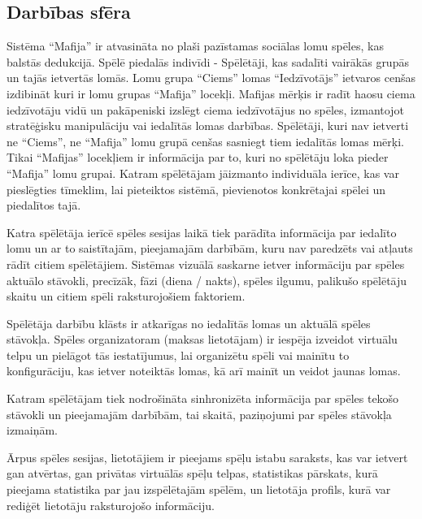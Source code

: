 \subsection*{Darbības sfēra}

Sistēma ``Mafija'' ir atvasināta no plaši pazīstamas sociālas lomu spēles, kas
balstās dedukcijā. Spēlē piedalās indivīdi - Spēlētāji, kas sadalīti vairākās
grupās un tajās ietvertās lomās. Lomu grupa ``Ciems'' lomas ``Iedzīvotājs''
ietvaros cenšas izdibināt kuri ir lomu grupas ``Mafija'' locekļi. Mafijas mērķis
ir radīt haosu ciema iedzīvotāju vidū un pakāpeniski izslēgt ciema iedzīvotājus
no spēles, izmantojot stratēģisku manipulāciju vai iedalītās lomas darbības.
Spēlētāji, kuri nav ietverti ne ``Ciems'', ne ``Mafija'' lomu grupā cenšas sasniegt
tiem iedalītās lomas mērķi. Tikai ``Mafijas'' locekļiem ir informācija par to,
kuri no spēlētāju loka pieder ``Mafija'' lomu grupai. Katram spēlētājam jāizmanto
individuāla ierīce, kas var pieslēgties tīmeklim, lai pieteiktos sistēmā,
pievienotos konkrētajai spēlei un piedalītos tajā.

Katra spēlētāja ierīcē spēles sesijas laikā tiek parādīta informācija par
iedalīto lomu un ar to saistītajām, pieejamajām darbībām, kuru nav paredzēts
vai atļauts rādīt citiem spēlētājiem. Sistēmas vizuālā saskarne ietver
informāciju par spēles aktuālo stāvokli, precīzāk, fāzi (diena / nakts), spēles
ilgumu, palikušo spēlētāju skaitu un citiem spēli raksturojošiem faktoriem.

Spēlētāja darbību klāsts ir atkarīgas no iedalītās lomas un aktuālā spēles
stāvokļa. Spēles organizatoram (maksas lietotājam) ir iespēja izveidot virtuālu
telpu un pielāgot tās iestatījumus, lai organizētu spēli vai mainītu to
konfigurāciju, kas ietver noteiktās lomas, kā arī mainīt un veidot jaunas
lomas.

Katram spēlētājam tiek nodrošināta sinhronizēta informācija par spēles tekošo
stāvokli un pieejamajām darbībām, tai skaitā, paziņojumi par spēles stāvokļa
izmaiņām.

Ārpus spēles sesijas, lietotājiem ir pieejams spēļu istabu saraksts, kas var
ietvert gan atvērtas, gan privātas virtuālās spēļu telpas, statistikas
pārskats, kurā pieejama statistika par jau izspēlētajām spēlēm, un lietotāja
profils, kurā var rediģēt lietotāju raksturojošo informāciju.
